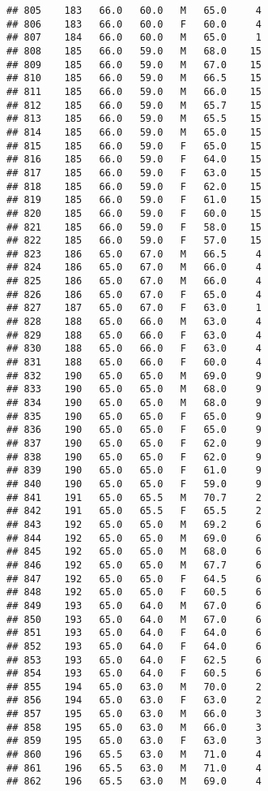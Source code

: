 \documentclass[
]{article}
\begin{document}
\begin{verbatim}
## 805    183   66.0   60.0   M   65.0     4
## 806    183   66.0   60.0   F   60.0     4
## 807    184   66.0   60.0   M   65.0     1
## 808    185   66.0   59.0   M   68.0    15
## 809    185   66.0   59.0   M   67.0    15
## 810    185   66.0   59.0   M   66.5    15
## 811    185   66.0   59.0   M   66.0    15
## 812    185   66.0   59.0   M   65.7    15
## 813    185   66.0   59.0   M   65.5    15
## 814    185   66.0   59.0   M   65.0    15
## 815    185   66.0   59.0   F   65.0    15
## 816    185   66.0   59.0   F   64.0    15
## 817    185   66.0   59.0   F   63.0    15
## 818    185   66.0   59.0   F   62.0    15
## 819    185   66.0   59.0   F   61.0    15
## 820    185   66.0   59.0   F   60.0    15
## 821    185   66.0   59.0   F   58.0    15
## 822    185   66.0   59.0   F   57.0    15
## 823    186   65.0   67.0   M   66.5     4
## 824    186   65.0   67.0   M   66.0     4
## 825    186   65.0   67.0   M   66.0     4
## 826    186   65.0   67.0   F   65.0     4
## 827    187   65.0   67.0   F   63.0     1
## 828    188   65.0   66.0   M   63.0     4
## 829    188   65.0   66.0   F   63.0     4
## 830    188   65.0   66.0   F   63.0     4
## 831    188   65.0   66.0   F   60.0     4
## 832    190   65.0   65.0   M   69.0     9
## 833    190   65.0   65.0   M   68.0     9
## 834    190   65.0   65.0   M   68.0     9
## 835    190   65.0   65.0   F   65.0     9
## 836    190   65.0   65.0   F   65.0     9
## 837    190   65.0   65.0   F   62.0     9
## 838    190   65.0   65.0   F   62.0     9
## 839    190   65.0   65.0   F   61.0     9
## 840    190   65.0   65.0   F   59.0     9
## 841    191   65.0   65.5   M   70.7     2
## 842    191   65.0   65.5   F   65.5     2
## 843    192   65.0   65.0   M   69.2     6
## 844    192   65.0   65.0   M   69.0     6
## 845    192   65.0   65.0   M   68.0     6
## 846    192   65.0   65.0   M   67.7     6
## 847    192   65.0   65.0   F   64.5     6
## 848    192   65.0   65.0   F   60.5     6
## 849    193   65.0   64.0   M   67.0     6
## 850    193   65.0   64.0   M   67.0     6
## 851    193   65.0   64.0   F   64.0     6
## 852    193   65.0   64.0   F   64.0     6
## 853    193   65.0   64.0   F   62.5     6
## 854    193   65.0   64.0   F   60.5     6
## 855    194   65.0   63.0   M   70.0     2
## 856    194   65.0   63.0   F   63.0     2
## 857    195   65.0   63.0   M   66.0     3
## 858    195   65.0   63.0   M   66.0     3
## 859    195   65.0   63.0   F   63.0     3
## 860    196   65.5   63.0   M   71.0     4
## 861    196   65.5   63.0   M   71.0     4
## 862    196   65.5   63.0   M   69.0     4

\end{verbatim}
\end{document}
